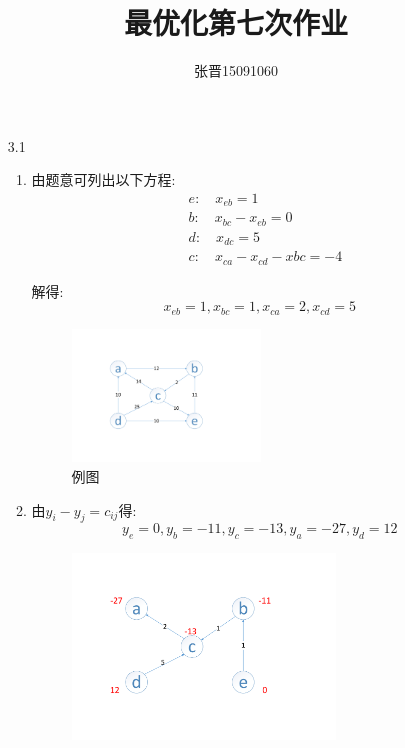 \documentclass[UTF8]{ctexart}
\title{\heiti 最优化第七次作业}
\author{\kaishu 张晋15091060}
\begin{document}
\maketitle
\begin{enumerate}
\item[3.1]
\begin{enumerate}
\item 由题意可列出以下方程:
\begin{align}
&e:\quad x_{eb}=1\\
&b:\quad x_{bc}-x_{eb}=0\\
&d:\quad x_{dc}=5\\
&c:\quad x_{ca}-x_{cd}-x{bc}=-4
\end{align}

解得:
\begin{equation}
x_{eb}=1,x_{bc}=1,x_{ca}=2,x_{cd}=5
\end{equation}

\begin{figure}[H]
\small
\centering
\includegraphics[width=5cm]{1.pdf}
\caption{例图}
\end{figure}

\item 由$y_i-y_j=c_{ij}$得:
\begin{equation}
y_e=0,y_b=-11,y_c=-13,y_a=-27,y_d=12
\end{equation}

\begin{figure}[H]
\small
\centering
\includegraphics[width=7cm]{2.pdf}
\end{figure}


\end{enumerate}
\end{enumerate}
\end{document}
